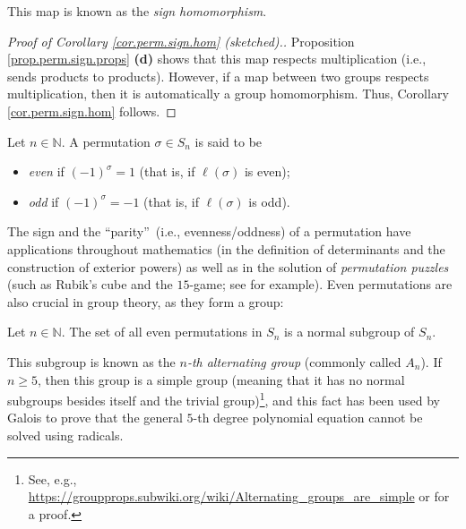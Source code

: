 This map is known as the \emph{sign homomorphism}.

\begin{proof}
[Proof of Corollary \ref{cor.perm.sign.hom} (sketched).]Proposition
\ref{prop.perm.sign.props} \textbf{(d)} shows that this map respects
multiplication (i.e., sends products to products). However, if a map between
two groups respects multiplication, then it is automatically a group
homomorphism. Thus, Corollary \ref{cor.perm.sign.hom} follows.
\end{proof}

\begin{definition}
\label{def.perm.even-odd}Let $n\in\mathbb{N}$. A permutation $\sigma\in S_{n}$
is said to be

\begin{itemize}
\item \emph{even} if $\left(  -1\right)  ^{\sigma}=1$ (that is, if
$\ell\left(  \sigma\right)  $ is even);

\item \emph{odd} if $\left(  -1\right)  ^{\sigma}=-1$ (that is, if
$\ell\left(  \sigma\right)  $ is odd).
\end{itemize}
\end{definition}

The sign and the \textquotedblleft parity\textquotedblright\ (i.e.,
evenness/oddness) of a permutation have applications throughout mathematics
(in the definition of determinants and the construction of exterior powers) as
well as in the solution of \emph{permutation puzzles} (such as Rubik's cube
and the $15$-game; see \cite[Chapters 7--8 and Theorem 20.2.1]{Mulhol21} for
example). Even permutations are also crucial in group theory, as they form a group:

\begin{corollary}
\label{cor.perm.altgp}Let $n\in\mathbb{N}$. The set of all even permutations
in $S_{n}$ is a normal subgroup of $S_{n}$.
\end{corollary}

This subgroup is known as the $n$\emph{-th alternating group} (commonly called
$A_{n}$). If $n\geq5$, then this group is a simple group (meaning that it has
no normal subgroups besides itself and the trivial group)\footnote{See, e.g.,
\url{https://groupprops.subwiki.org/wiki/Alternating_groups_are_simple} or
\cite[Theorem 10.3.4]{Goodman} for a proof.}, and this fact has been used by
Galois to prove that the general $5$-th degree polynomial equation cannot be
solved using radicals.


